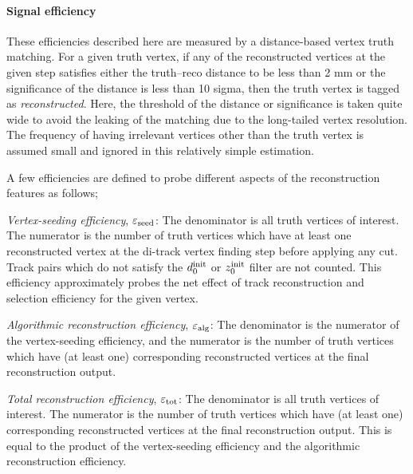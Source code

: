 \paragraph{Signal efficiency}
These efficiencies described here are measured by a distance-based vertex truth matching. For a given truth vertex, if any of the reconstructed vertices at the given step satisfies either the truth--reco distance to be less than 2 mm or the significance of the distance is less than 10 sigma, then the truth vertex is tagged as \emph{reconstructed}. Here, the threshold of the distance or significance is taken quite wide to avoid the leaking of the matching due to the long-tailed vertex resolution. The frequency of having irrelevant vertices other than the truth vertex is assumed small and ignored in this relatively simple estimation.

A few efficiencies are defined to probe different aspects of the reconstruction features as follows;
\begin{description}
\item{\emph{Vertex-seeding efficiency}, $\varepsilon_{\rm seed}$}: The denominator is all truth vertices of interest. The numerator is the number of truth vertices which have at least one reconstructed vertex at the di-track vertex finding step before applying any cut. Track pairs which do not satisfy the $d_{0}^{\rm init}$ or $z_{0}^{\rm init}$ filter are not counted. This efficiency approximately probes the net effect of track reconstruction and selection efficiency for the given vertex.

\item{\emph{Algorithmic reconstruction efficiency}, $\varepsilon_{\rm alg}$}: The denominator is the numerator of the vertex-seeding efficiency, and the numerator is the number of truth vertices which have (at least one) corresponding reconstructed vertices at the final reconstruction output.

\item{\emph{Total reconstruction efficiency}, $\varepsilon_{\rm tot}$}: The denominator is all truth vertices of interest. The numerator is the number of truth vertices which have (at least one) corresponding reconstructed vertices at the final reconstruction output. This is equal to the product of the vertex-seeding efficiency and the algorithmic reconstruction efficiency.
\end{description}

